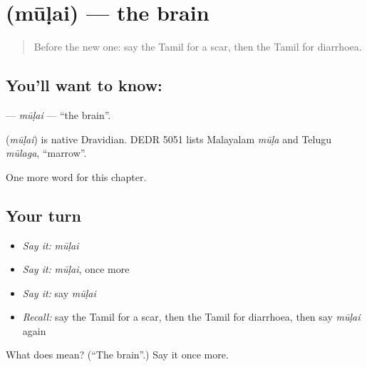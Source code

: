 \section[\texorpdfstring{\ta{மூளை} (mūḷai)}{மூளை (mūḷai)}]{ (mūḷai) — the brain}

\label{lesson:TA-C170-mulai}



\begin{quote}
Before the new one: say the Tamil for a scar, then the Tamil for diarrhoea.
\end{quote}

\subsection*{You'll want to know: }
\textbf{} — \emph{mūḷai} — \textquotedblleft{}the brain\textquotedblright{}.

\begin{cousinweb}
\textbf{} (\emph{mūḷai}) is native Dravidian. DEDR 5051 lists Malayalam \emph{mūḷa} and Telugu \emph{mūlaga}, \textquotedblleft{}marrow\textquotedblright{}.
\end{cousinweb}

\begin{grammarlens}[title={What you've built}]
One more word for this chapter.
\end{grammarlens}

\subsection*{Your turn}
\begin{itemize}
\raggedright
  \item \emph{Say it:} \emph{mūḷai}
  \item \emph{Say it:} \emph{mūḷai}, once more
  \item \emph{Say it:} say \emph{mūḷai}
  \item \emph{Recall:} say the Tamil for a scar, then the Tamil for diarrhoea, then say \emph{mūḷai} again
\end{itemize}

\begin{tcolorbox}[breakable,colback=teal!4,colframe=teal!35!black,title={Before you move on}]
What does  mean? (\textquotedblleft{}The brain\textquotedblright{}.) Say it once more.
\end{tcolorbox}
